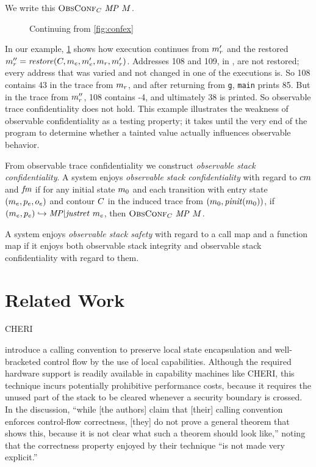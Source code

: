 \documentclass[acmsmall,review,anonymous]{acmart}\settopmatter{printfolios=true,printccs=false,printacmref=false}
\begin{document}
      We write this \(\text{\sc ObsConf}_C ~ \mathit{MP} ~ M\).

      \begin{figure}
        \confidentialitylazyexample
        \caption{Continuing from \cref{fig:confex}}
        \label{fig:conflex}
      \end{figure}

      In our example, \cref{fig:conflex} shows how execution continues from
      \(m_r'\) and the restored \(m_r'' = \mathit{restore}(C,
      m_e,m_e',m_r,m_r')\). Addresses 108 and 109, in \tainted,
      are not restored; every address that was varied and not changed in one
      of the executions is. So 108 contains 43 in the trace from \(m_r\),
      and after returning from {\tt g}, {\tt main} prints 85. But in the trace
      from \(m_r''\), 108 contains -4, and ultimately 38 is printed.
      So observable trace confidentiality does not hold. This example
      illustrates the weakness of observable confidentiality as a testing
      property; it takes until the very end of the program to determine whether
      a tainted value actually influences observable behavior.


      From observable trace confidentiality we construct {\em observable stack
      confidentiality}. A system enjoys {\em observable stack confidentiality}
      with regard to \(cm\) and \(\mathit{fm}\) if for any initial state
      \(m_0\) and each transition with entry state
      \((m_e,p_e,o_e)\) and contour \(C\) in the
      induced trace from \((m_0,\mathit{pinit}(m_0))\), if
      \((m_e,p_e) \hookrightarrow \mathit{MP} | \mathit{justret}\ m_e\),
      then \(\text{\sc ObsConf}_C ~ \mathit{MP} ~ M\).

      A system enjoys {\em observable stack safety} with regard to a call map
      and a function map if it enjoys both observable stack integrity and
      observable stack confidentiality with regard to them.

\section{Related Work}
\label{sec:relwork}

CHERI 

\citet{Skorstengaard+19b} introduce a calling convention to preserve local state
encapsulation and well-bracketed control flow by the use of local capabilities.
Although the required hardware support is readily available in capability
machines like CHERI, this technique incurs potentially prohibitive performance
costs, because it requires the unused part of the stack to be cleared whenever a
security boundary is crossed. In the discussion, ``while [the authors] claim
that [their] calling convention enforces control-flow correctness, [they] do not
prove a general theorem that shows this, because it is not clear what such a
theorem should look like,'' noting that the correctness property enjoyed by
their technique ``is not made very explicit.''
\end{document}
